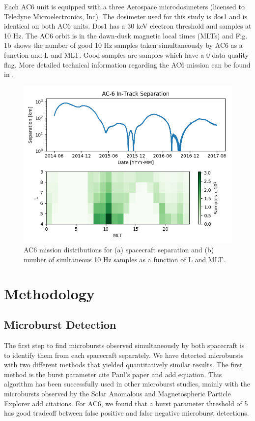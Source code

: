 \documentclass[draft]{agujournal2019}
\begin{document}
Each AC6 unit is equipped with a three Aerospace microdosimeters (licensed to Teledyne Microelectronics, Inc). The dosimeter used for this study is dos1 and is identical on both AC6 units. Dos1 has a 30 keV electron threshold and samples at 10 Hz. The AC6 orbit is in the dawn-dusk magnetic local times (MLTs) and Fig. 1b shows the number of good 10 Hz samples taken simultaneously by AC6 as a function and L and MLT. Good samples are samples which have a 0 data quality flag. More detailed technical information regarding the AC6 mission can be found in .

\begin{figure}
\includegraphics[width=\textwidth]{fig1.png}
\caption{AC6 mission distributions for (a) spacecraft separation and (b) number of simltaneous 10 Hz samples as a function of L and MLT.} \label{fig1}
\end{figure}

\section{Methodology}
\subsection{Microburst Detection}
The first step to find microbursts observed simultaneously by both spacecraft is to identify them from each spacecraft separately. We have detected microbursts with two different methods that yielded quantitatively similar results. The first method is the burst parameter cite Paul’s paper and add equation. This algorithm has been successfully used in other microburst studies, mainly with the microbursts observed by the Solar Anomalous and Magnetospheric Particle Explorer add citations. For AC6, we found that a burst parameter threshold of 5 has good tradeoff between false positive and false negative microburst detections.
\end{document}
